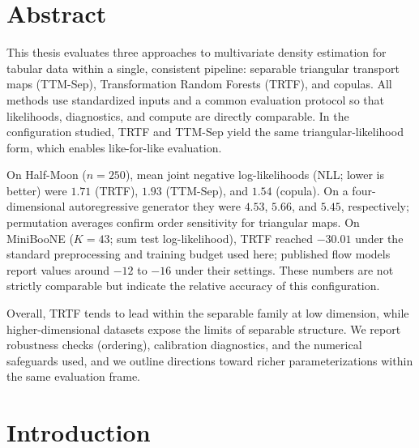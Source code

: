 \documentclass[11pt,a4paper,twoside]{book}\usepackage[]{graphicx}\usepackage[]{xcolor}
\begin{document}





\graphicspath{{./figure/}}
\frontmatter
{}
\setcounter{tocdepth}{1}

\chapter*{Abstract}

This thesis evaluates three approaches to multivariate density estimation for tabular data within a single, consistent pipeline: separable triangular transport maps (TTM-Sep), Transformation Random Forests (TRTF), and copulas. All methods use standardized inputs and a common evaluation protocol so that likelihoods, diagnostics, and compute are directly comparable. In the configuration studied, TRTF and TTM-Sep yield the same triangular-likelihood form, which enables like-for-like evaluation.

On Half-Moon ($n=250$), mean joint negative log-likelihoods (NLL; lower is better) were $1.71$ (TRTF), $1.93$ (TTM-Sep), and $1.54$ (copula). On a four-dimensional autoregressive generator they were $4.53$, $5.66$, and $5.45$, respectively; permutation averages confirm order sensitivity for triangular maps. On MiniBooNE ($K=43$; sum test log-likelihood), TRTF reached $-30.01$ under the standard preprocessing and training budget used here; published flow models report values around $-12$ to $-16$ under their settings. These numbers are not strictly comparable but indicate the relative accuracy of this configuration.

Overall, TRTF tends to lead within the separable family at low dimension, while higher-dimensional datasets expose the limits of separable structure. We report robustness checks (ordering), calibration diagnostics, and the numerical safeguards used, and we outline directions toward richer parameterizations within the same evaluation frame.

\tableofcontents
{}

\cleardoublepage
\mainmatter






\chapter{Introduction}\label{ch:intro}
\end{document}
